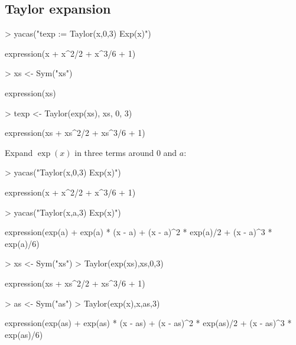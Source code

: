 \documentclass[10pt]{article}
\begin{document}
\subsection{Taylor expansion}
\label{sec:taylor-expansion}

\begin{Schunk}
\begin{Sinput}
> yacas("texp := Taylor(x,0,3) Exp(x)")
\end{Sinput}
\begin{Soutput}
expression(x + x^2/2 + x^3/6 + 1)
\end{Soutput}
\end{Schunk}

\begin{Schunk}
\begin{Sinput}
> xs <- Sym("xs")
\end{Sinput}
\begin{Soutput}
expression(xs)
\end{Soutput}
\begin{Sinput}
> texp <- Taylor(exp(xs), xs, 0, 3)
\end{Sinput}
\begin{Soutput}
expression(xs + xs^2/2 + xs^3/6 + 1)
\end{Soutput}
\end{Schunk}


Expand $\exp(x)$ in three terms
around $0$ and $a$:
\begin{Schunk}
\begin{Sinput}
> yacas("Taylor(x,0,3) Exp(x)")
\end{Sinput}
\begin{Soutput}
expression(x + x^2/2 + x^3/6 + 1)
\end{Soutput}
\begin{Sinput}
> yacas("Taylor(x,a,3) Exp(x)")
\end{Sinput}
\begin{Soutput}
expression(exp(a) + exp(a) * (x - a) + (x - a)^2 * exp(a)/2 + 
    (x - a)^3 * exp(a)/6)
\end{Soutput}
\end{Schunk}

\begin{Schunk}
\begin{Sinput}
> xs <- Sym("xs")
> Taylor(exp(xs),xs,0,3)
\end{Sinput}
\begin{Soutput}
expression(xs + xs^2/2 + xs^3/6 + 1)
\end{Soutput}
\begin{Sinput}
> as <- Sym("as")
> Taylor(exp(x),x,as,3)
\end{Sinput}
\begin{Soutput}
expression(exp(as) + exp(as) * (x - as) + (x - as)^2 * exp(as)/2 + 
    (x - as)^3 * exp(as)/6)
\end{Soutput}
\end{Schunk}
\end{document}
